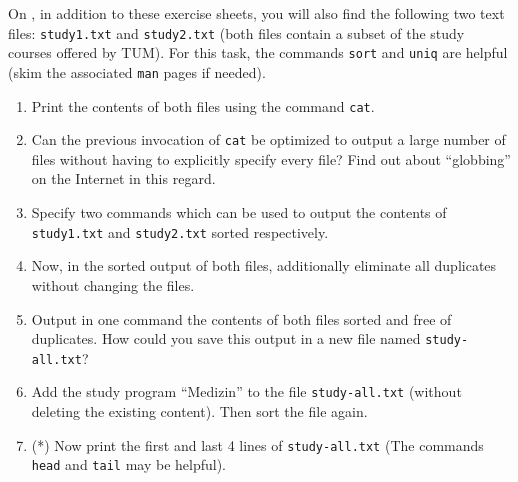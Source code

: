 \documentclass[english]{sheet}
\begin{document}
\begin{exercise}[subtitle=Pipes and Output Redirection]
    On , in addition to these exercise sheets, you will also find the following two text files: \texttt{study1.txt} and \texttt{study2.txt} (both files contain a subset of the study courses offered by TUM). For this task, the commands \texttt{sort} and \texttt{uniq} are helpful (skim the associated \texttt{man} pages if needed).
    \begin{enumerate}
        \item Print the contents of both files using the command \texttt{cat}.
        \item Can the previous invocation of \texttt{cat} be optimized to output a large number of files without having to explicitly specify every file? Find out about ``globbing'' on the Internet in this regard.
        \item Specify two commands which can be used to output the contents of  \texttt{study1.txt} and \texttt{study2.txt} sorted respectively.
        \item Now, in the sorted output of both files, additionally eliminate all duplicates without changing the files.
        \item Output in one command the contents of both files sorted and free of duplicates. How could you save this output in a new file named \texttt{study-all.txt}?
        \item Add the study program ``Medizin'' to the file \texttt{study-all.txt} (without deleting the existing content). Then sort the file again.
        \item (*) Now print the first and last 4 lines of \texttt{study-all.txt} (The commands \texttt{head} and \texttt{tail} may be helpful).
    \end{enumerate}
\end{exercise}
\end{document}

